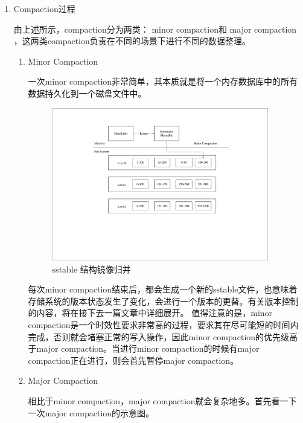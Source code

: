 \begin{enumerate}
\begin{enumerate}
				
				
			\end{enumerate}

			\item Compaction过程 
			
			由上述所示，compaction分为两类：
				minor compaction和				major compaction
				，这两类compaction负责在不同的场景下进行不同的数据整理。
			\begin{enumerate}
				\item Minor Compaction
				
				一次minor compaction非常简单，其本质就是将一个内存数据库中的所有数据持久化到一个磁盘文件中。
				
				\begin{figure}[H]
					\centering
					\includegraphics[width=0.95\textwidth]{pdf/minor_compaction.pdf}
					\caption{sstable 结构镜像归并}
					\label{sstable_minor_compaction}
				\end{figure}
				
				每次minor compaction结束后，都会生成一个新的sstable文件，也意味着存储系统的版本状态发生了变化，会进行一个版本的更替。有关版本控制的内容，将在接下去一篇文章中详细展开。
				值得注意的是，minor compaction是一个时效性要求非常高的过程，要求其在尽可能短的时间内完成，否则就会堵塞正常的写入操作，因此minor compaction的优先级高于major compaction。当进行minor compaction的时候有major compaction正在进行，则会首先暂停major compaction。
				
				\item Major Compaction
				
				相比于minor compaction，major compaction就会复杂地多。首先看一下一次major compaction的示意图。
				

\end{enumerate}
\end{enumerate}
